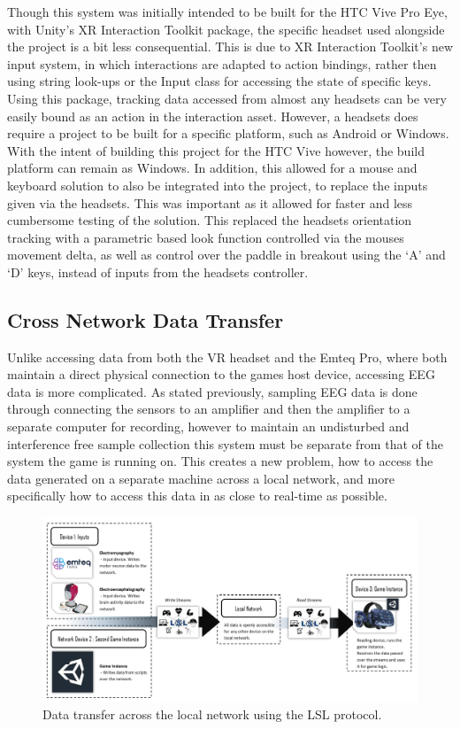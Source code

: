 \documentclass[11pt, a4paper]{article}
\begin{document}
Though this system was initially intended to be built for the HTC Vive Pro Eye, with Unity's XR Interaction Toolkit package, the specific headset used alongside the project is a bit less consequential. This is due to XR Interaction Toolkit's new input system, in which interactions are adapted to action bindings, rather then using string look-ups or the Input class for accessing the state of specific keys. Using this package, tracking data accessed from almost any headsets can be very easily bound as an action in the interaction asset. However, a headsets does require a project to be built for a specific platform, such as Android or Windows. With the intent of building this project for the HTC Vive however, the build platform can remain as Windows. In addition, this allowed for a mouse and keyboard solution to also be integrated into the project, to replace the inputs given via the headsets. This was important as it allowed for faster and less cumbersome testing of the solution. This replaced the headsets orientation tracking with a parametric based look function controlled via the mouses movement delta, as well as control over the paddle in breakout using the `A' and `D' keys, instead of inputs from the headsets controller.




\pagebreak
\subsection{Cross Network Data Transfer}
	
Unlike accessing data from both the VR headset and the Emteq Pro, where both maintain a direct physical connection to the games host device, accessing EEG data is more complicated. As stated previously, sampling EEG data is done through connecting the sensors to an amplifier and then the amplifier to a separate computer for recording, however to maintain an undisturbed and interference free sample collection this system must be separate from that of the system the game is running on. This creates a new problem, how to access the data generated on a separate machine across a local network, and more specifically how to access this data in as close to real-time as possible.


\begin{figure}[H]
	\centering
	\includegraphics[width = 0.9 \linewidth] {[ Figures ]/System Diagram - Network Transfer.png}
	\captionsetup{font = small, labelfont = small, width=.8\linewidth}
	\caption{Data transfer across the local network using the LSL protocol.}
	\label{fig:networking_diagram}
\end{figure}
\end{document}
